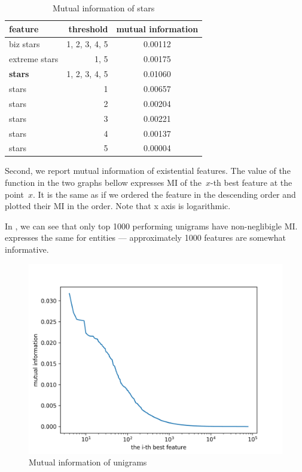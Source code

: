 \begin{table}[h!]
\centering
\begin{tabular}{lrS[table-format=3.2]}
\toprule
\textbf{feature} & \textbf{threshold} & \textbf{mutual information} \\
\midrule
biz stars & 1, 2, 3, 4, 5 & 0.00112 \\
extreme stars & 1, 5 & 0.00175 \\
\textbf{stars} & 1, 2, 3, 4, 5& 0.01060 \\
stars & 1 & 0.00657 \\
stars & 2 & 0.00204 \\
stars & 3 & 0.00221 \\
stars & 4 & 0.00137 \\
stars & 5 & 0.00004 \\
\bottomrule
\end{tabular}

\caption{Mutual information of stars}\label{tab:mi_stars}
\end{table}


Second, we report mutual information of existential features.
The value of the function in the two graphs bellow expresses
MI of the~$x$-th best feature at the point~$x$.
It is the same as if we ordered the feature in the descending order
and plotted their MI in the order.
Note that x axis is logarithmic.

In ,
we can see that only top 1000 performing unigrams have non-neglibigle MI.
 expresses the same for entities
--- approximately 1000 features are somewhat informative.


\begin{figure}[ht]\centering
\includegraphics[width=130mm]{figures/unigrams.png}
\caption{Mutual information of unigrams}
\label{fig:mi_unigrams}
\end{figure}


